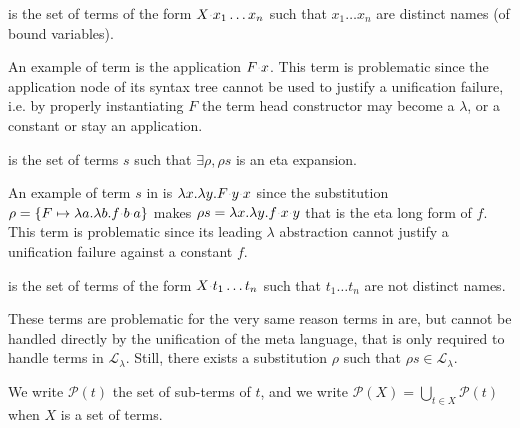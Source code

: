 \documentclass[sigconf,natbib=false,review]{acmart}
\newcommand{\appsep}{\ensuremath{\textcolor{lightgray}{\cdot}}}
\newcommand{\llambda}{\ensuremath{\mathcal{L}_\lambda}\xspace}
\begin{document}
\begin{definition}[\maybebeta]\label{def:maybebeta}
  \maybebeta is the set of terms of the form $X \appsep x_1 \ldots x_n$
  such that $x_1 \ldots x_n$ are distinct names (of bound variables).
\end{definition}

\noindent
An example of term \maybebeta{} is the application $F \appsep x$.
This term is problematic since the application node of
its syntax tree cannot be used to justify a
unification failure, i.e. by properly instantiating $F$ the term
head constructor may become a $\lambda$, or a constant or stay an application.

\begin{definition}[\maybeeta]\label{def:maybeeta}
  \maybeeta is the set of terms $s$ such that $\exists \rho, \rho s$
  is an eta expansion.
\end{definition}

\noindent
An example of term $s$ in \maybeeta{} is
$\lambda x.\lambda y.F \appsep y \appsep x$
since the substitution
$\rho = \{ F \mapsto \lambda a.\lambda b.f \appsep b \appsep a\}$
makes $\rho s = \lambda x.\lambda y.f \appsep x \appsep y$
that is the eta long form of $f$. This term is problematic since
its leading $\lambda$ abstraction cannot justify a
unification failure against a constant $f$.

\begin{definition}[\notllambda]\label{def:notllambda}
  \notllambda is the set of terms of the form $X \appsep t_1 \ldots t_n$
  such that $t_1 \ldots t_n$ are not distinct names.
\end{definition}

\noindent
These terms are problematic for the very same reason terms in \maybebeta are,
but cannot be handled directly by the unification of the meta language, that
is only required to handle terms in \llambda. Still, there exists a
substitution $\rho$ such that $\rho s \in \llambda$.


\newcommand{\subterm}[1]{\ensuremath{\mathcal{P}(#1)}}
We write $\subterm{t}$ the set of sub-terms of $t$, and
we write $\subterm{X} = \bigcup_{t\in X} \subterm{t}$ when $X$ is a set of terms.
\end{document}
